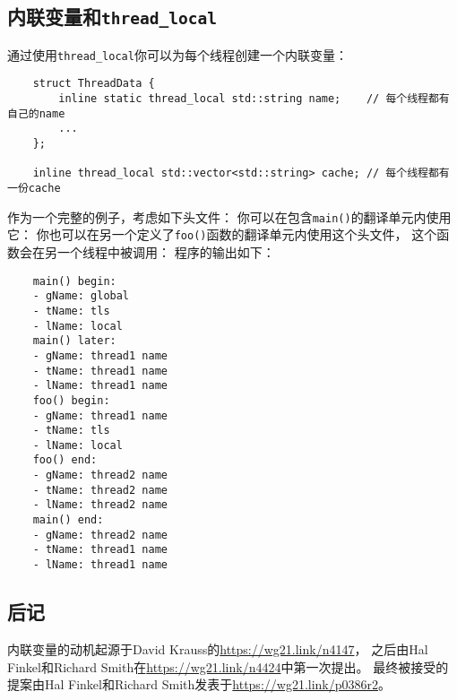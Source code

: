 \subsection{内联变量和\texttt{thread\_local}}
通过使用\texttt{thread\_local}你可以为每个线程创建一个内联变量：
\begin{lstlisting}
    struct ThreadData {
        inline static thread_local std::string name;    // 每个线程都有自己的name
        ...
    };

    inline thread_local std::vector<std::string> cache; // 每个线程都有一份cache
\end{lstlisting}
作为一个完整的例子，考虑如下头文件：
你可以在包含\texttt{main()}的翻译单元内使用它：
你也可以在另一个定义了\texttt{foo()}函数的翻译单元内使用这个头文件，
这个函数会在另一个线程中被调用：
程序的输出如下：
\begin{lstlisting}
    main() begin:
    - gName: global
    - tName: tls
    - lName: local
    main() later:
    - gName: thread1 name
    - tName: thread1 name
    - lName: thread1 name
    foo() begin:
    - gName: thread1 name
    - tName: tls
    - lName: local
    foo() end:
    - gName: thread2 name
    - tName: thread2 name
    - lName: thread2 name
    main() end:
    - gName: thread2 name
    - tName: thread1 name
    - lName: thread1 name
\end{lstlisting}

\subsection{后记}
内联变量的动机起源于David Krauss的\url{https://wg21.link/n4147}，
之后由Hal Finkel和Richard Smith在\url{https://wg21.link/n4424}中第一次提出。
最终被接受的提案由Hal Finkel和Richard Smith发表于\url{https://wg21.link/p0386r2}。

\setcounter{footnote}{0}